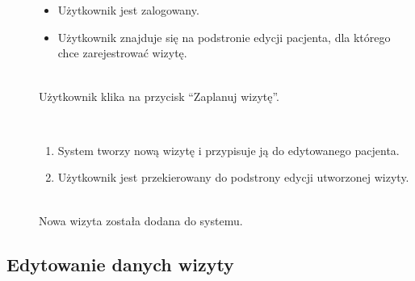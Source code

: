 \documentclass[11pt]{aghdpl}
\begin{document}
	\begin{description}
		\item[\useCaseAktor] \hfill \\
			\useCaseUzytkownik
		\item[\useCaseWarPocz] \hfill \\
			\begin{itemize}
				\item Użytkownik jest zalogowany.
				\item Użytkownik znajduje się na podstronie edycji pacjenta, dla którego chce zarejestrować wizytę.
			\end{itemize}
		\item[\useCaseZdarzInicj] \hfill \\
			Użytkownik klika na przycisk ``Zaplanuj wizytę''.
		\item[\useCaseScenBaz] \hfill \\ 
			\begin{enumerate}
				\item System tworzy nową wizytę i przypisuje ją do edytowanego pacjenta.
				\item Użytkownik jest przekierowany do podstrony edycji utworzonej wizyty.
			\end{enumerate}
		\item[\useCaseWarKonc] \hfill \\ 
			Nowa wizyta została dodana do systemu.
	\end{description}

\subsection{Edytowanie danych wizyty}
\end{document}
